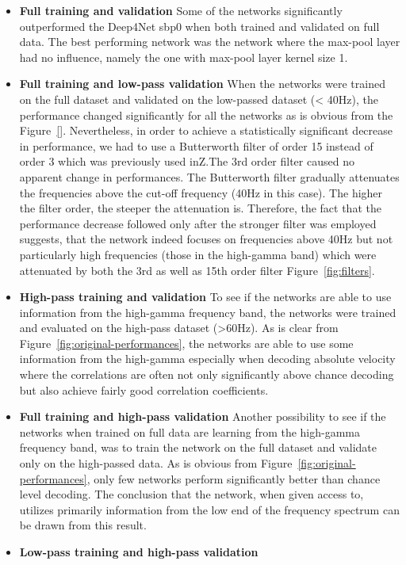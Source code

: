 \begin{itemize}
    \item \textbf{Full training and validation} Some of the networks significantly outperformed the Deep4Net sbp0 when both trained and validated on full data. The best performing network was the network where the max-pool layer had no influence, namely the one with max-pool layer kernel size 1.
    \item \textbf{Full training and low-pass validation} When the networks were trained on the full dataset and validated on the low-passed dataset (< 40Hz), the performance changed significantly for all the networks as is obvious from the Figure~\ref{}.
    Nevertheless, in order to achieve a statistically significant decrease in performance, we had to use a Butterworth filter of order 15 instead of order 3 which was previously used inZ\cite{Hammer-2021}.The 3rd order filter caused no apparent change in performances.
    The Butterworth filter gradually attenuates the frequencies above the cut-off frequency (40Hz in this case).
    The higher the filter order, the steeper the attenuation is.
    Therefore, the fact that the performance decrease followed only after the stronger filter was employed suggests, that the network indeed focuses on frequencies above 40Hz but not particularly high frequencies (those in the high-gamma band) which were attenuated by both the 3rd as well as 15th order filter Figure~\ref{fig:filters}.
    \item \textbf{High-pass training and validation} To see if the networks are able to use information from the high-gamma frequency band, the networks were trained and evaluated on the high-pass dataset (>60Hz).
    As is clear from Figure~\ref{fig:original-performances}, the networks are able to use some information from the high-gamma especially when decoding absolute velocity where the correlations are often not only significantly above chance decoding but also achieve fairly good correlation coefficients.
    \item \textbf{Full training and high-pass validation} Another possibility to see if the networks when trained on full data are learning from the high-gamma frequency band, was to train the network on the full dataset and validate only on the high-passed data.
    As is obvious from Figure~\ref{fig:original-performances}, only few networks perform significantly better than chance level decoding. The conclusion that the network, when given access to, utilizes primarily information from the low end of the frequency spectrum can be drawn from this result.
    \item \textbf{Low-pass training and high-pass validation}
    

\end{itemize}
